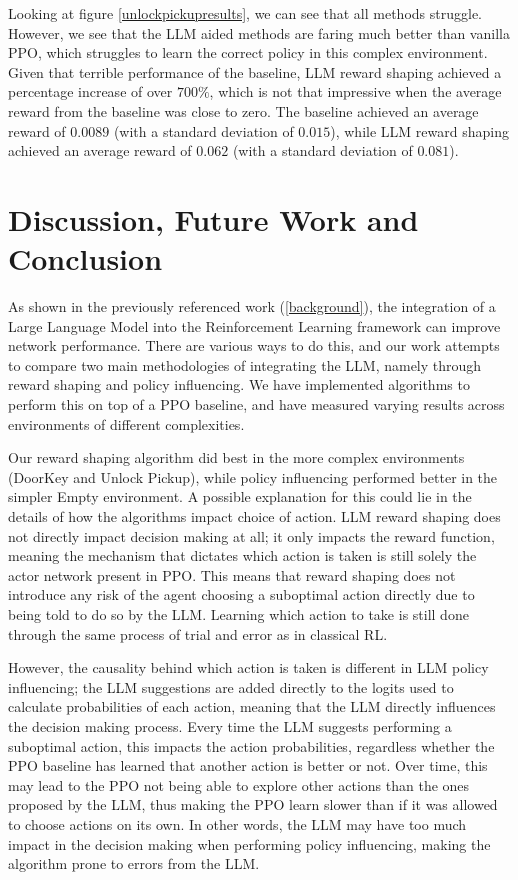 \documentclass[conference]{IEEEtran}
\begin{document}
Looking at figure \ref{unlockpickupresults}, we can see that all methods struggle. However, we see that the LLM aided methods are faring much better than vanilla PPO, which struggles to learn the correct policy in this complex environment. Given that terrible performance of the baseline, LLM reward shaping achieved a percentage increase of over $700\%$, which is not that impressive when the average reward from the baseline was close to zero. The baseline achieved an average reward of $0.0089$ (with a standard deviation of $0.015$), while LLM reward shaping achieved an average reward of $0.062$ (with a standard deviation of $0.081$).


\section{Discussion, Future Work and Conclusion}

As shown in the previously referenced work (\ref{background}), the integration of a Large Language Model into the Reinforcement Learning framework can improve network performance. There are various ways to do this, and our work attempts to compare two main methodologies of integrating the LLM, namely through reward shaping and policy influencing. We have implemented algorithms to perform this on top of a PPO baseline, and have measured varying results across environments of different complexities.

Our reward shaping algorithm did best in the more complex environments (DoorKey and Unlock Pickup), while policy influencing performed better in the simpler Empty environment. A possible explanation for this could lie in the details of how the algorithms impact choice of action. LLM reward shaping does not directly impact decision making at all; it only impacts the reward function, meaning the mechanism that dictates which action is taken is still solely the actor network present in PPO. This means that reward shaping does not introduce any risk of the agent choosing a suboptimal action directly due to being told to do so by the LLM. Learning which action to take is still done through the same process of trial and error as in classical RL.

However, the causality behind which action is taken is different in LLM policy influencing; the LLM suggestions are added directly to the logits used to calculate probabilities of each action, meaning that the LLM directly influences the decision making process. Every time the LLM suggests performing a suboptimal action, this impacts the action probabilities, regardless whether the PPO baseline has learned that another action is better or not. Over time, this may lead to the PPO not being able to explore other actions than the ones proposed by the LLM, thus making the PPO learn slower than if it was allowed to choose actions on its own. In other words, the LLM may have too much impact in the decision making when performing policy influencing, making the algorithm prone to errors from the LLM.
\end{document}
